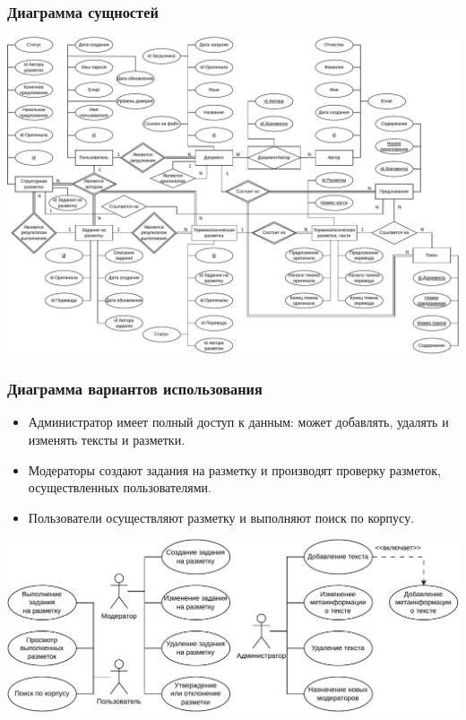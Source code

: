 \documentclass{beamer}
\begin{document}
\begin{frame}
    \frametitle{Диаграмма сущностей}
    \centering
	\includegraphics[width=\textwidth]{diag/chen-v9.pdf}
\end{frame}

\begin{frame}
    \frametitle{Диаграмма вариантов использования}
    \begin{itemize}
        \item Администратор имеет полный доступ к данным: может добавлять, удалять и изменять тексты и разметки.
        \item Модераторы создают задания на разметку и производят проверку разметок, осуществленных пользователями.
        \item Пользователи осуществляют разметку и выполняют поиск по корпусу.
    \end{itemize}
    \vfill
    \centering
	\includegraphics[width=\textwidth]{diag/use-case-v2.pdf}
\end{frame}
\end{document}
